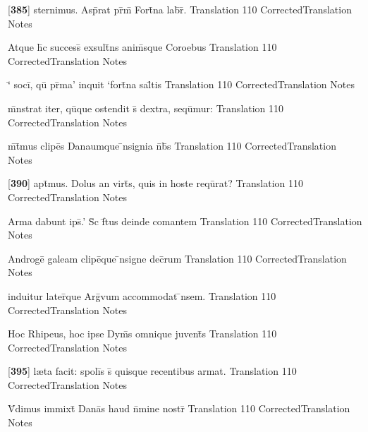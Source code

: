 \latline
  {[\textbf{385}] sternimus.  Asp\={\macron {\i}}rat pr\={\macron {\i}}m\={} Fort\={}na lab\={}r\={\macron {\i}}.}
  { Translation }
  {110}
  { CorrectedTranslation }
  { Notes }


\latline
  {Atque h\={\macron {\i}}c success\={} exsult\={}ns anim\={\macron {\i}}sque Coroebus}
  { Translation }
  {110}
  { CorrectedTranslation }
  { Notes }


\latline
  {`\={} soci\={\macron {\i}}, qu\={} pr\={\macron {\i}}ma' inquit `fort\={}na sal\={}tis}
  { Translation }
  {110}
  { CorrectedTranslation }
  { Notes }


\latline
  {m\={}nstrat iter, qu\={}que ostendit s\={} dextra, sequ\={}mur:}
  { Translation }
  {110}
  { CorrectedTranslation }
  { Notes }


\latline
  {m\={}t\={}mus clipe\={}s Danaumque \={\macron {\i}}nsignia n\={}b\={\macron {\i}}s}
  { Translation }
  {110}
  { CorrectedTranslation }
  { Notes }


\latline
  {[\textbf{390}] apt\={}mus.  Dolus an virt\={}s, quis in hoste requ\={\macron {\i}}rat?}
  { Translation }
  {110}
  { CorrectedTranslation }
  { Notes }


\latline
  {Arma dabunt ips\={\macron {\i}}.'  S\={\macron {\i}}c f\={}tus deinde comantem}
  { Translation }
  {110}
  { CorrectedTranslation }
  { Notes }


\latline
  {Androge\={} galeam clipe\={\macron {\i}}que \={\macron {\i}}nsigne dec\={}rum}
  { Translation }
  {110}
  { CorrectedTranslation }
  { Notes }


\latline
  {induitur later\={\macron {\i}}que Arg\={\macron {\i}}vum accommodat \={}nsem.  }
  { Translation }
  {110}
  { CorrectedTranslation }
  { Notes }


\latline
  {Hoc Rhipeus, hoc ipse Dym\={}s omnique juvent\={}s}
  { Translation }
  {110}
  { CorrectedTranslation }
  { Notes }


\latline
  {[\textbf{395}] l{\ae}ta facit:  spoli\={\macron {\i}}s s\={} quisque recentibus armat.}
  { Translation }
  {110}
  { CorrectedTranslation }
  { Notes }


\latline
  {V\={}dimus immixt\={\macron {\i}} Dana\={\macron {\i}}s haud n\={}mine nostr\={}}
  { Translation }
  {110}
  { CorrectedTranslation }
  { Notes }



